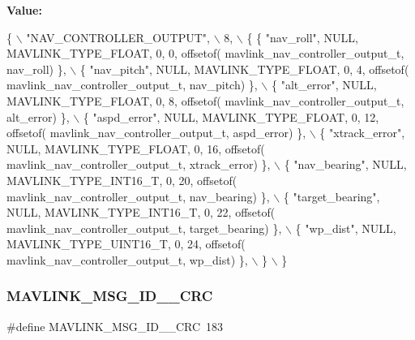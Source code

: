{\bfseries Value\+:}
\begin{DoxyCode}
\{ \(\backslash\)
    \textcolor{stringliteral}{"NAV\_CONTROLLER\_OUTPUT"}, \(\backslash\)
    8, \(\backslash\)
    \{  \{ \textcolor{stringliteral}{"nav\_roll"}, NULL, MAVLINK_TYPE_FLOAT, 0, 0, offsetof(
      mavlink_nav_controller_output_t, nav\_roll) \}, \(\backslash\)
         \{ \textcolor{stringliteral}{"nav\_pitch"}, NULL, MAVLINK_TYPE_FLOAT, 0, 4, offsetof(
      mavlink_nav_controller_output_t, nav\_pitch) \}, \(\backslash\)
         \{ \textcolor{stringliteral}{"alt\_error"}, NULL, MAVLINK_TYPE_FLOAT, 0, 8, offsetof(
      mavlink_nav_controller_output_t, alt\_error) \}, \(\backslash\)
         \{ \textcolor{stringliteral}{"aspd\_error"}, NULL, MAVLINK_TYPE_FLOAT, 0, 12, offsetof(
      mavlink_nav_controller_output_t, aspd\_error) \}, \(\backslash\)
         \{ \textcolor{stringliteral}{"xtrack\_error"}, NULL, MAVLINK_TYPE_FLOAT, 0, 16, offsetof(
      mavlink_nav_controller_output_t, xtrack\_error) \}, \(\backslash\)
         \{ \textcolor{stringliteral}{"nav\_bearing"}, NULL, MAVLINK_TYPE_INT16_T, 0, 20, offsetof(
      mavlink_nav_controller_output_t, nav\_bearing) \}, \(\backslash\)
         \{ \textcolor{stringliteral}{"target\_bearing"}, NULL, MAVLINK_TYPE_INT16_T, 0, 22, offsetof(
      mavlink_nav_controller_output_t, target\_bearing) \}, \(\backslash\)
         \{ \textcolor{stringliteral}{"wp\_dist"}, NULL, MAVLINK_TYPE_UINT16_T, 0, 24, offsetof(
      mavlink_nav_controller_output_t, wp\_dist) \}, \(\backslash\)
         \} \(\backslash\)
\}
\end{DoxyCode}
\mbox{\label{mavlink__msg__nav__controller__output_8h_abfecf549284186b493f03872e3864f21}} 
\subsubsection{M\+A\+V\+L\+I\+N\+K\+\_\+\+M\+S\+G\+\_\+\+I\+D\+\_\+\_\+\+C\+RC}
{\footnotesize\ttfamily \#define M\+A\+V\+L\+I\+N\+K\+\_\+\+M\+S\+G\+\_\+\+I\+D\+\_\+\_\+\+C\+RC~183}

